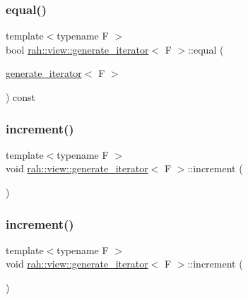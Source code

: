 \subsubsection{\texorpdfstring{equal()}{equal()}\hspace{0.1cm}{\footnotesize\ttfamily [2/2]}}
{\footnotesize\ttfamily template$<$typename F $>$ \\
bool \mbox{\hyperlink{structrah_1_1view_1_1generate__iterator}{rah\+::view\+::generate\+\_\+iterator}}$<$ F $>$\+::equal (\begin{DoxyParamCaption}\item[{\mbox{\hyperlink{structrah_1_1view_1_1generate__iterator}{generate\+\_\+iterator}}$<$ F $>$}]{ }\end{DoxyParamCaption}) const\hspace{0.3cm}{\ttfamily [inline]}}

\mbox{\label{structrah_1_1view_1_1generate__iterator_aeb0fc0db74bda811fe5d7cb8c6efe1e0}} 
\subsubsection{\texorpdfstring{increment()}{increment()}\hspace{0.1cm}{\footnotesize\ttfamily [1/2]}}
{\footnotesize\ttfamily template$<$typename F $>$ \\
void \mbox{\hyperlink{structrah_1_1view_1_1generate__iterator}{rah\+::view\+::generate\+\_\+iterator}}$<$ F $>$\+::increment (\begin{DoxyParamCaption}{ }\end{DoxyParamCaption})\hspace{0.3cm}{\ttfamily [inline]}}

\mbox{\label{structrah_1_1view_1_1generate__iterator_aeb0fc0db74bda811fe5d7cb8c6efe1e0}} 
\subsubsection{\texorpdfstring{increment()}{increment()}\hspace{0.1cm}{\footnotesize\ttfamily [2/2]}}
{\footnotesize\ttfamily template$<$typename F $>$ \\
void \mbox{\hyperlink{structrah_1_1view_1_1generate__iterator}{rah\+::view\+::generate\+\_\+iterator}}$<$ F $>$\+::increment (\begin{DoxyParamCaption}{ }\end{DoxyParamCaption})\hspace{0.3cm}{\ttfamily [inline]}}



